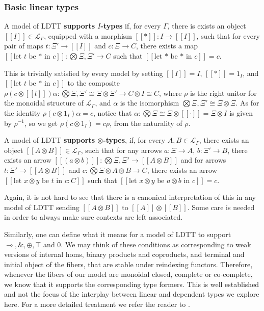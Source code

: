 \documentclass[a4paper,english]{lipics-v2018}
\begin{document}
  \subsubsection{Basic linear types}
  \begin{definition}
  A model of LDTT \textbf{supports $I$-types} if, for every $\Gamma$, there is exists an object $[[I]] \in \mathcal{L}_{\Gamma}$, equipped with a morphism $[[*]] : I \to [[I]]$, such that for every pair of maps $t : \Xi' \to [[I]]$ and $c : \Xi \to C$, there exists a map $[[\text{let $t$ be * in $c$}]] : \bigotimes \Xi, \Xi' \to C$ such that $[[\text{let * be * in $c$}]] = c$.
\end{definition}
This is trivially satisfied by every model by setting $[[I]] = I$, $[[*]] = 1_{I}$, and $[[\text{let $t$ be * in $c$}]]$ to the composite $\rho (c \otimes [[t]]) \alpha  : \bigotimes \Xi, \Xi' \cong \Xi \otimes \Xi' \to C \otimes I \cong C$, where $\rho$ is the right unitor for the monoidal structure of $\mathcal{L}_{\Gamma}$, and $\alpha$ is the isomorphism $\bigotimes \Xi, \Xi' \cong \Xi \otimes \Xi$. As for the identity $\rho(c \otimes 1_{I}) \alpha = c$, notice that $\alpha : \bigotimes \Xi \cong \Xi \otimes [[\cdot]] = \Xi \otimes I$ is given by $\rho^{-1}$, so we get $\rho (c \otimes 1_I) = c \rho$, from the naturality of $\rho$.

\begin{definition}
  A model of LDTT \textbf{supports $\otimes$-types}, if, for every $A, B \in \mathcal{L}_{\Gamma}$, there exists an object $[[A \otimes B]] \in \mathcal{L}_{\Gamma}$, such that for any arrows $a : \Xi \to A$, $b : \Xi' \to B$, there exists an arrow $[[(a \otimes b)]] : \bigotimes \Xi, \Xi' \to [[A \otimes B]]$ and for arrows $t : \Xi' \to [[A \otimes B]]$ and $c : \bigotimes \Xi \otimes A \otimes B \to C$, there exists an arrow $[[\text{let $x \otimes y$ be $t$ in $c : C$}]]$ such that $[[\text{let $x \otimes y$ be $a \otimes b$ in $c$}]] = c$.
\end{definition}
Again, it is not hard to see that there is a canonical interpretation of this in any model of LDTT sending $[[A \otimes B]]$ to $[[A]] \otimes [[B]]$. Some care is needed in order to always make sure contexts are left associated.


Similarly, one can define what it means for a model of LDTT to support $\multimap, \&, \oplus, \top$ and $0$. We may think of these conditions as corresponding to weak versions of internal homs, binary products and coproducts, and terminal and initial object of the fibers, that are stable under reindexing functors. Therefore, whenever the fibers of our model are monoidal closed, complete or co-complete, we know that it supports the corresponding type formers. This is well established and not the focus of the interplay between linear and dependent types we explore here. For a more detailed treatment we refer the reader to \cite{mellies}.
\end{document}
